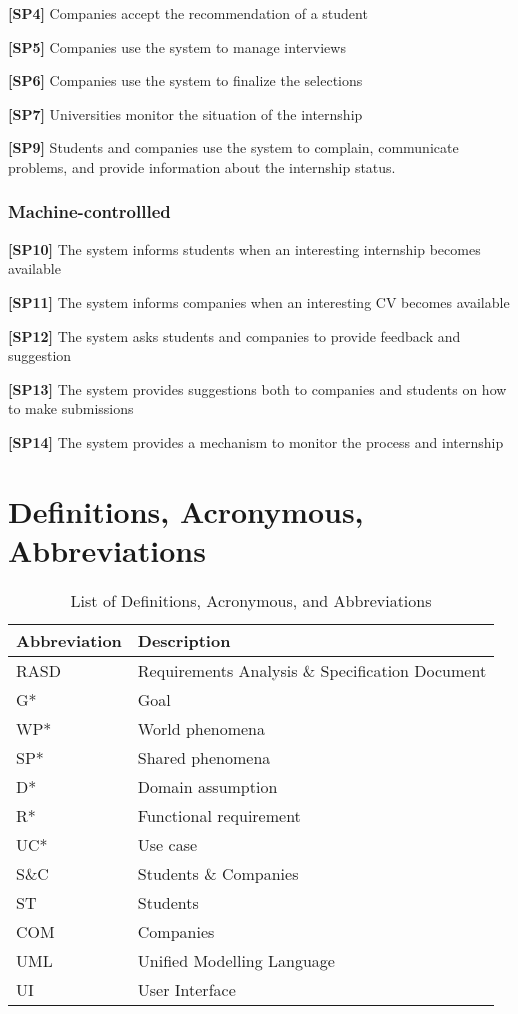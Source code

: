 \textbf{[SP4]} Companies accept the recommendation of a student

\textbf{[SP5]} Companies use the system to manage interviews

\textbf{[SP6]} Companies use the system to finalize the selections

\textbf{[SP7]} Universities monitor the situation of the internship

\textbf{[SP9] }Students and companies use the system to complain, communicate problems, and provide information about the internship status.

\subsubsection{Machine-controllled}
\textbf{[SP10]} The system informs students when an interesting internship becomes available

\textbf{[SP11]} The system informs companies when an interesting CV becomes available

\textbf{[SP12]} The system asks students and companies to provide feedback and suggestion

\textbf{[SP13]} The system provides suggestions both to companies and students on how to make submissions

\textbf{[SP14] }The system provides a mechanism to monitor the process and internship


\section{Definitions, Acronymous, Abbreviations}
\begin{table}[H]
\centering
\begin{tabular}{|l|l|}
\hline
\textbf{Abbreviation} & \textbf{Description} \\ \hline
RASD & Requirements Analysis \& Specification Document \\ \hline
G* & Goal \\ \hline
WP* & World phenomena \\ \hline
SP* & Shared phenomena \\ \hline
D* & Domain assumption \\ \hline
R* & Functional requirement \\ \hline
UC* & Use case \\ \hline
S\&C & Students \& Companies \\ \hline
ST & Students \\ \hline
COM & Companies \\ \hline
UML & Unified Modelling Language \\ \hline
UI & User Interface \\ \hline
\end{tabular}
\caption{List of Definitions, Acronymous, and Abbreviations}
\label{table:abbreviations}
\end{table}


